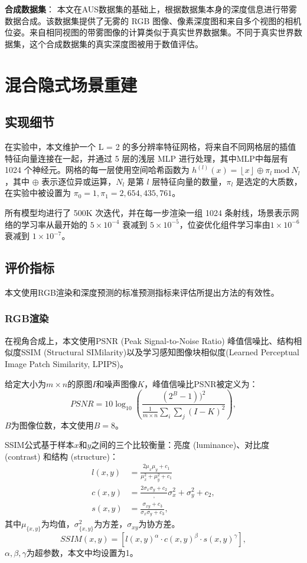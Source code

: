 \textbf{合成数据集}：
本文在AUS数据集的基础上，根据数据集本身的深度信息进行带雾数据合成。该数据集提供了无雾的 RGB 图像、像素深度图和来自多个视图的相机位姿。来自相同视图的带雾图像的计算类似于真实世界数据集。不同于真实世界数据集，这个合成数据集的真实深度图被用于数值评估。

\section{混合隐式场景重建}
\subsection{实现细节}
在实验中，本文维护一个 L = 2 的多分辨率特征网格，将来自不同网格层的插值特征向量连接在一起，并通过 5 层的浅层 MLP 进行处理，其中MLP中每层有 1024 个神经元。网格的每一层使用空间哈希函数为 $h^{(l)}(x) = \left\lfloor x\right\rfloor \oplus \pi_l\ \text{mod}\ N_l$，其中 $\oplus$ 表示逐位异或运算，$N_l$ 是第 $l$ 层特征向量的数量，$π_l$ 是选定的大质数，在实验中被设置为 $\pi_0 = 1, \pi_1 = 2,654,435, 761$。

所有模型均进行了 500K 次迭代，并在每一步渲染一组 1024 条射线，场景表示网络的学习率从最开始的 $5\times10^{-4}$ 衰减到 $5\times10^{-5}$，位姿优化组件学习率由$1\times10^{-6}$ 衰减到 $1\times10^{-7}$。

\subsection{评价指标}
本文使用RGB渲染和深度预测的标准预测指标来评估所提出方法的有效性。
\subsubsection{RGB渲染}
在视角合成上，本文使用PSNR (Peak Signal-to-Noise Ratio) 峰值信噪比\cite{hore_image_2010}、结构相似度SSIM (Structural SIMilarity)\cite{hore_image_2010}以及学习感知图像块相似度(Learned Perceptual Image Patch Similarity, LPIPS)\cite{zhang_unreasonable_2018}。

给定大小为$m\times n$的原图$I$和噪声图像$K$，峰值信噪比PSNR被定义为：
\begin{equation}
    PSNR =  10\log_{10}(\frac{(2^B-1))^2}{\frac{1}{m\times n}\sum_i\sum_j(I-K)^2}),
\end{equation}
$B$为图像位数，本文使用$B=8$。

SSIM公式基于样本$x$和$y$之间的三个比较衡量：亮度 (luminance)、对比度 (contrast) 和结构 (structure)：
\begin{align}
    l(x,y) &= \frac{2\mu_x\mu_y+c_1}{\mu_x^2+\mu_y^2+c_1}\\
    c(x,y) &= \frac{2\sigma_x\sigma_y+c_2},{\sigma_x^2+\sigma_y^2+c_2},\\
    s(x,y) &= \frac{\sigma_{xy}+c_3}{\sigma_x\sigma_y+c_3},
\end{align}
其中$\mu_{\{x,y\}}$为均值，$\sigma_{\{x,y\}}^2$为方差，$\sigma_{xy}$为协方差。
\begin{equation}
    SSIM(x,y) = [l(x,y)^\alpha\cdot c(x,y)^\beta\cdot s(x,y)^\gamma],
\end{equation}
$\alpha, \beta, \gamma$为超参数，本文中均设置为1。

